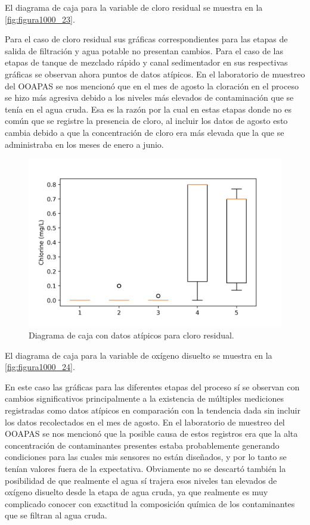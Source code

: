 El diagrama de caja para la variable de cloro residual se muestra en la \autoref{fig:figura1000_23}.

Para el caso de cloro residual sus gráficas correspondientes para las etapas de salida de filtración y agua potable no presentan cambios. Para el caso de las etapas de tanque de mezclado rápido y canal sedimentador en sus 
respectivas gráficas se observan ahora puntos de datos atípicos. En el laboratorio de muestreo del OOAPAS se nos mencionó que en el mes de agosto la cloración en el proceso se hizo más agresiva debido a los niveles más elevados 
de contaminación que se tenía en el agua cruda. Esa es la razón por la cual en estas etapas donde no es común que se registre la presencia de cloro, al incluir los datos de agosto esto cambia debido a que la concentración 
de cloro era más elevada que la que se administraba en los meses de enero a junio.

\clearpage

\begin{figure}[h]
	\centering
	\includegraphics[scale=1.0]{imgss173.png}
	\caption{Diagrama de caja con datos atípicos para cloro residual.}
	\label{fig:figura1000_23}
\end{figure} 

El diagrama de caja para la variable de oxígeno disuelto se muestra en la \autoref{fig:figura1000_24}.

En este caso las gráficas para las diferentes etapas del proceso sí se observan con cambios significativos principalmente a la existencia de múltiples mediciones registradas como datos atípicos en comparación con la tendencia 
dada sin incluir los datos recolectados en el mes de agosto. En el laboratorio de muestreo del OOAPAS se nos mencionó que la posible causa de estos registros era que la alta concentración de contaminantes presentes estaba 
probablemente generando condiciones para las cuales mis sensores no están diseñados, y por lo tanto se tenían valores fuera de la expectativa. Obviamente no se descartó también la posibilidad de que realmente el agua sí 
trajera esos niveles tan elevados de oxígeno disuelto desde la etapa de agua cruda, ya que realmente es muy complicado conocer con exactitud la composición química de los contaminantes que se filtran al agua cruda. 

